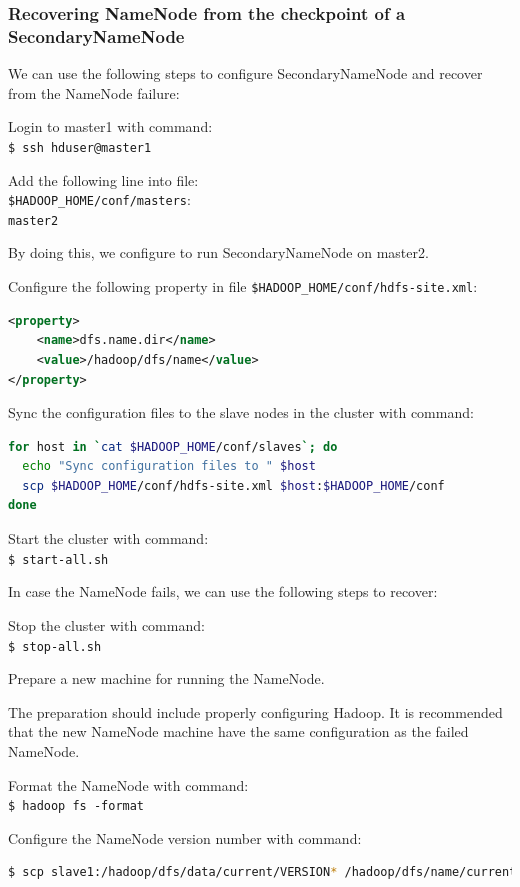 \subsubsection*{Recovering NameNode from the checkpoint of a SecondaryNameNode}
We can use the following steps to configure SecondaryNameNode and recover from the NameNode failure:

Login to master1 with command:\\
\verb|$ ssh hduser@master1|

Add the following line into file:\\
 \verb|$HADOOP_HOME/conf/masters|:\\
\verb|master2|

By doing this, we configure to run SecondaryNameNode on master2.

Configure the following property in file \verb|$HADOOP_HOME/conf/hdfs-site.xml|:
\lstset{style=bashstyle}
\begin{lstlisting}[language=XML]
<property>
    <name>dfs.name.dir</name>
    <value>/hadoop/dfs/name</value>
</property>
\end{lstlisting}

Sync the configuration files to the slave nodes in the cluster with command:
\lstset{style=bashstyle}
\begin{lstlisting}[language=bash]
for host in `cat $HADOOP_HOME/conf/slaves`; do
  echo "Sync configuration files to " $host
  scp $HADOOP_HOME/conf/hdfs-site.xml $host:$HADOOP_HOME/conf
done
\end{lstlisting}

Start the cluster with command: \\
\verb|$ start-all.sh|

In case the NameNode fails, we can use the following steps to recover:

Stop the cluster with command: \\
\verb|$ stop-all.sh|

Prepare a new machine for running the NameNode.

The preparation should include properly configuring Hadoop. It is recommended that the new NameNode machine have the same configuration as the failed NameNode.

Format the NameNode with command: \\
\verb|$ hadoop fs -format|

Configure the NameNode version number with command:
\lstset{style=bashstyle}
\begin{lstlisting}[language=bash]
$ scp slave1:/hadoop/dfs/data/current/VERSION* /hadoop/dfs/name/current/VERSION
\end{lstlisting}

